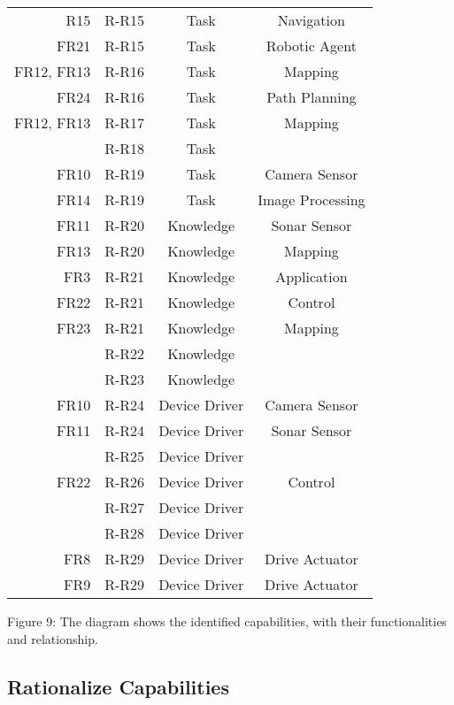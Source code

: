 \begin{tabular}{| r | l | c | c |}
	R15 					& R-R15 & Task & Navigation\\
	FR21 					& R-R15 & Task & Robotic Agent\\
	FR12, FR13 				& R-R16 & Task & Mapping\\
	FR24 					& R-R16 & Task & Path Planning\\
	FR12, FR13 				& R-R17 & Task & Mapping\\
							& R-R18 & Task & \\
	FR10 					& R-R19 & Task & Camera Sensor\\
	FR14	 				& R-R19 & Task & Image Processing\\
	FR11 					& R-R20 & Knowledge & Sonar Sensor\\
	FR13 					& R-R20 & Knowledge & Mapping\\
	FR3 					& R-R21 & Knowledge & Application\\
	FR22 					& R-R21 & Knowledge & Control\\
	FR23 					& R-R21 & Knowledge & Mapping\\
							& R-R22 & Knowledge & \\
							& R-R23 & Knowledge & \\
	FR10 					& R-R24 & Device Driver & Camera Sensor\\
	FR11 					& R-R24 & Device Driver & Sonar Sensor\\
							& R-R25 & Device Driver & \\
	FR22 					& R-R26 & Device Driver & Control\\
							& R-R27 & Device Driver & \\
							& R-R28 & Device Driver & \\
	FR8 					& R-R29 & Device Driver & Drive Actuator\\
	FR9 					& R-R29 & Device Driver & Drive Actuator\\

\end{tabular}



Figure 9: The diagram shows the identified capabilities, with their functionalities and relationship.



\subsection{Rationalize Capabilities}
